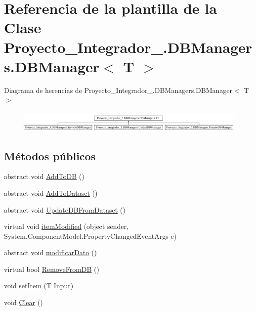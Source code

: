 \hypertarget{class_proyecto___integrador__3_1_1_d_b_managers_1_1_d_b_manager_3_01_t_01_4}{\section{Referencia de la plantilla de la Clase Proyecto\-\_\-\-Integrador\-\_.\-D\-B\-Managers.\-D\-B\-Manager$<$ T $>$}
\label{class_proyecto___integrador__3_1_1_d_b_managers_1_1_d_b_manager_3_01_t_01_4}
}
Diagrama de herencias de Proyecto\-\_\-\-Integrador\-\_.\-D\-B\-Managers.\-D\-B\-Manager$<$ T $>$\begin{figure}[H]
\begin{center}
\leavevmode
\includegraphics[height=1.075889cm]{class_proyecto___integrador__3_1_1_d_b_managers_1_1_d_b_manager_3_01_t_01_4}
\end{center}
\end{figure}
\subsection*{Métodos públicos}
\begin{DoxyCompactItemize}
\item 
abstract void \hyperlink{class_proyecto___integrador__3_1_1_d_b_managers_1_1_d_b_manager_3_01_t_01_4_a820a55f3ee3c7fde31b121f3f3ea6179}{Add\-To\-D\-B} ()
\item 
abstract void \hyperlink{class_proyecto___integrador__3_1_1_d_b_managers_1_1_d_b_manager_3_01_t_01_4_a7830332e065723c1799d5804fd202dd1}{Add\-To\-Dataset} ()
\item 
abstract void \hyperlink{class_proyecto___integrador__3_1_1_d_b_managers_1_1_d_b_manager_3_01_t_01_4_aecafeb72fd4ce55d76c16c804e38dae8}{Update\-D\-B\-From\-Dataset} ()
\item 
virtual void \hyperlink{class_proyecto___integrador__3_1_1_d_b_managers_1_1_d_b_manager_3_01_t_01_4_a49ea2a7bfa58a2c536fefa4d60d488d2}{item\-Modified} (object sender, System.\-Component\-Model.\-Property\-Changed\-Event\-Args e)
\item 
abstract void \hyperlink{class_proyecto___integrador__3_1_1_d_b_managers_1_1_d_b_manager_3_01_t_01_4_a0cd8914cf3417e3df2f9d580fdb48aca}{modificar\-Dato} ()
\item 
virtual bool \hyperlink{class_proyecto___integrador__3_1_1_d_b_managers_1_1_d_b_manager_3_01_t_01_4_a436cb08914ca84122f9019a59485589a}{Remove\-From\-D\-B} ()
\item 
void \hyperlink{class_proyecto___integrador__3_1_1_d_b_managers_1_1_d_b_manager_3_01_t_01_4_a2d552a5e547efd19924ca4a96f685a56}{set\-Item} (T Input)
\item 
void \hyperlink{class_proyecto___integrador__3_1_1_d_b_managers_1_1_d_b_manager_3_01_t_01_4_ad5d7f99a4a5783514bad64ba8894e1ea}{Clear} ()
\end{DoxyCompactItemize}
